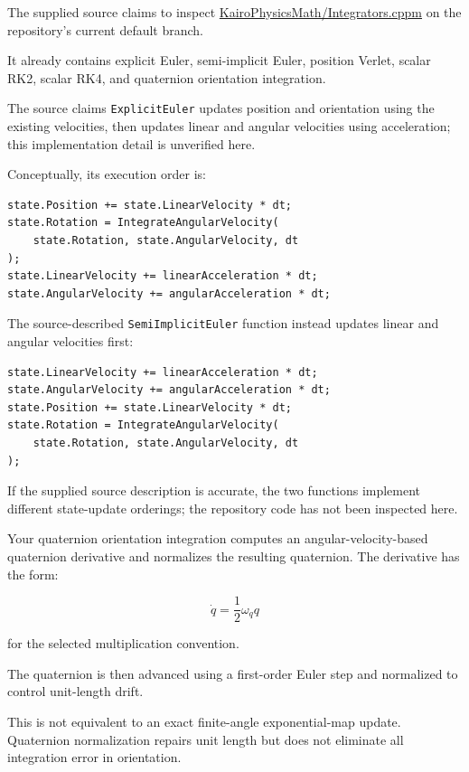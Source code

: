 The supplied source claims to inspect \href{https://github.com/swayam8624/KairoPhysicsMath/blob/main/Integrators.cppm?utm_source=chatgpt.com}{KairoPhysicsMath/Integrators.cppm} on the repository's current default branch.

It already contains explicit Euler, semi-implicit Euler, position Verlet, scalar RK2, scalar RK4, and quaternion orientation integration.

The source claims \texttt{ExplicitEuler} updates position and orientation using the existing velocities, then updates linear and angular velocities using acceleration; this implementation detail is unverified here.

Conceptually, its execution order is:

\begin{verbatim}
state.Position += state.LinearVelocity * dt;
state.Rotation = IntegrateAngularVelocity(
    state.Rotation, state.AngularVelocity, dt
);
state.LinearVelocity += linearAcceleration * dt;
state.AngularVelocity += angularAcceleration * dt;
\end{verbatim}

The source-described \texttt{SemiImplicitEuler} function instead updates linear and angular velocities first:

\begin{verbatim}
state.LinearVelocity += linearAcceleration * dt;
state.AngularVelocity += angularAcceleration * dt;
state.Position += state.LinearVelocity * dt;
state.Rotation = IntegrateAngularVelocity(
    state.Rotation, state.AngularVelocity, dt
);
\end{verbatim}

If the supplied source description is accurate, the two functions implement different state-update orderings; the repository code has not been inspected here.

Your quaternion orientation integration computes an angular-velocity-based quaternion derivative and normalizes the resulting quaternion. The derivative has the form:

\[
\dot q=\frac12\omega_q q
\]

for the selected multiplication convention.

The quaternion is then advanced using a first-order Euler step and normalized to control unit-length drift.

This is not equivalent to an exact finite-angle exponential-map update. Quaternion normalization repairs unit length but does not eliminate all integration error in orientation.

